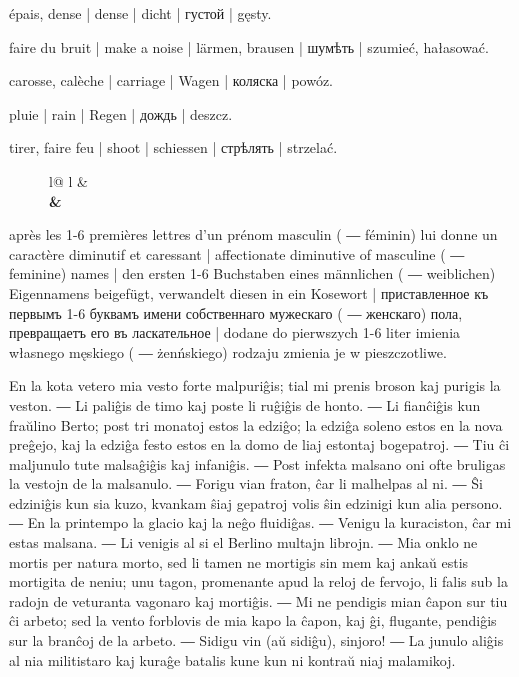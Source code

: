\begin{ekzvocab}{1em}
 épais, dense | dense | dicht | густой | gęsty.

 faire du bruit | make a noise | lärmen, brausen | шумѣть | szumieć, hałasować.

 carosse, calèche | carriage | Wagen | коляска | powóz.

 pluie | rain | Regen | дождь | deszcz.

 tirer, faire feu | shoot | schiessen | стрѣлять | strzelać.
\vspace{2pt}

\begin{minipage}{\textwidth}
\setlength{\leftskip}{1em}
\setlength{\parindent}{0em}
\begin{wrapfigure}[2]{l}[1.65em]{1.5em}
\vspace{-3.6ex}
\begin{tblr}{l@{ }l}
\footnotesize {} & \footnotesize \bf \trbb \\
\footnotesize {} & \\
\end{tblr}%
\end{wrapfigure}
après les 1-6 premières lettres d’un prénom masculin ( ― féminin) lui donne un caractère diminutif et caressant | affectionate diminutive of masculine ( ― feminine) names | den ersten 1-6 Buchstaben eines männlichen ( ― weiblichen) Eigennamens beigefügt, verwandelt diesen in ein Kosewort | приставленное къ первымъ 1-6 буквамъ имени собственнаго мужескаго ( ― женскаго) пола, превращаетъ его въ ласкательное | dodane do pierwszych 1-6 liter imienia własnego męskiego ( ― żenńskiego) rodzaju zmienia je w pieszczotliwe.
\end{minipage}

\end{ekzvocab}


En la kota vetero mia vesto forte malpuriĝis; tial mi prenis broson kaj purigis la veston. ― Li paliĝis de timo kaj poste li ruĝiĝis de honto. ― Li fianĉiĝis kun fraŭlino Berto; post tri monatoj estos la edziĝo; la edziĝa soleno estos en la nova preĝejo, kaj la edziĝa festo estos en la domo de liaj estontaj bogepatroj. ― Tiu ĉi maljunulo tute malsaĝiĝis kaj infaniĝis. ― Post infekta malsano oni ofte bruligas la vestojn de la malsanulo. ― Forigu vian fraton, ĉar li malhelpas al ni. ― Ŝi edziniĝis kun sia kuzo, kvankam ŝiaj gepatroj volis ŝin edzinigi kun alia persono. ― En la printempo la glacio kaj la neĝo fluidiĝas. ― Venigu la kuraciston, ĉar mi estas malsana. ― Li venigis al si el Berlino multajn librojn. ― Mia onklo ne mortis per natura morto, sed li tamen ne mortigis sin mem kaj ankaŭ estis mortigita de neniu; unu tagon, promenante apud la reloj de fervojo, li falis sub la radojn de veturanta vagonaro kaj mortiĝis. ― Mi ne pendigis mian ĉapon sur tiu ĉi arbeto; sed la vento forblovis de mia kapo la ĉapon, kaj ĝi, flugante, pendiĝis sur la branĉoj de la arbeto. ― Sidigu vin (aŭ sidiĝu), sinjoro! ― La junulo aliĝis al nia militistaro kaj kuraĝe batalis kune kun ni kontraŭ niaj malamikoj.

